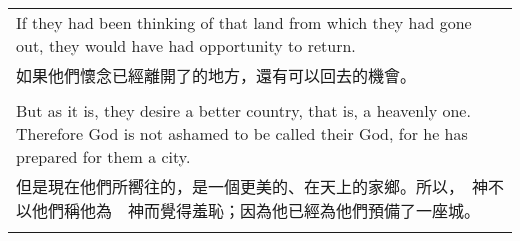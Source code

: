 \begin{tabularx}{\textwidth}{p{}}
If they had been thinking of that land from which they had gone out, they would have had opportunity to return. \\
如果他們懷念已經離開了的地方，還有可以回去的機會。 \\ \\
But as it is, they desire a better country, that is, a heavenly one. Therefore God is not ashamed to be called their God, for he has prepared for them a city. \\
但是現在他們所嚮往的，是一個更美的、在天上的家鄉。所以，　神不以他們稱他為　神而覺得羞恥；因為他已經為他們預備了一座城。 \\ \\

\hline
\end{tabularx}

\newpage

